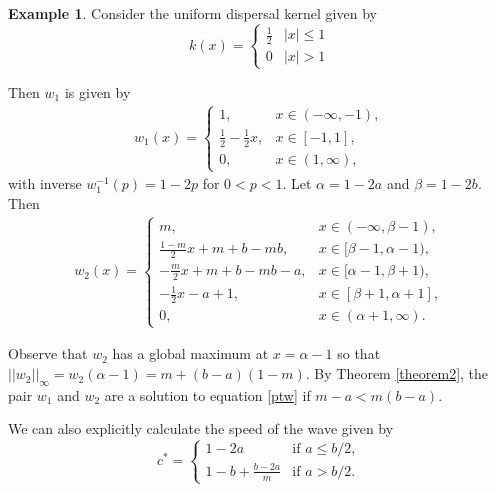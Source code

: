 \documentclass[11pt]{article}
\theoremstyle{definition}
\newtheorem{ex}[thm]{Example}
\numberwithin{equation}{section}
\numberwithin{thm}{section}
\begin{document}
\begin{ex}
Consider the uniform dispersal kernel given by
\begin{equation}
k(x) = \begin{cases}
\frac{1}{2} & |x|\leq 1 \\
0 & |x| > 1
\end{cases} \end{equation}

Then $w_1$ is given by
\begin{equation}  \label{uniformw1}
\begin{aligned}
w_1(x) 
= \begin{cases}
1, & x \in (-\infty, -1), \\
\frac{1}{2}-\frac{1}{2}x, & x \in [-1, 1] ,\\
0, & x \in (1, \infty),
\end{cases}
\end{aligned} \end{equation}
with inverse $w_1^{-1}(p)=1-2p$ for $0<p<1$. Let $\alpha=1-2a$ and $\beta=1-2b$. Then
\begin{equation} \label{uniformw2}
\begin{aligned}
w_2(x) 
= \begin{cases}
m,
& x \in (-\infty, \beta-1), \\
\frac{1-m}{2}x + m + b - mb,
& x \in [\beta - 1, 
 \alpha- 1), \\
-\frac{m}{2}x +m+b- mb-a,
& x \in [\alpha - 1, \beta + 1), \\
-\frac{1}{2} x-a+1,
& x \in [\beta + 1, \alpha + 1], \\
0,
& x \in (\alpha+1,\infty).
\end{cases}
\end{aligned} \end{equation}

Observe that $w_2$ has a global maximum at $x=\alpha-1$ so that $||w_2||_\infty=w_2(\alpha-1)=m+(b-a)(1-m)$. By Theorem \ref{theorem2}, the pair $w_1$ and $w_2$ are a solution to equation \eqref{ptw} if $m-a<m(b-a)$.

We can also explicitly calculate the speed of the wave given by
\begin{equation} \label{c}
c^* = \begin{cases}
1 - 2a & \text{if } a \leq b/2, \\
1 -b + \frac{b - 2a}{m} & \text{if }a > b/2.
\end{cases}
\end{equation}
\end{ex}
\end{document}
